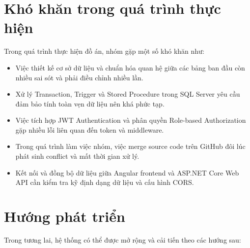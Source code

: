 
\section{Khó khăn trong quá trình thực hiện}\label{Sec5.3}

Trong quá trình thực hiện đồ án, nhóm gặp một số khó khăn như:

\begin{itemize}

  \item Việc thiết kế cơ sở dữ liệu và chuẩn hóa quan hệ giữa các bảng
  ban đầu còn nhiều sai sót và phải điều chỉnh nhiều lần.

  \item Xử lý Transaction, Trigger và Stored Procedure trong SQL Server
  yêu cầu đảm bảo tính toàn vẹn dữ liệu nên khá phức tạp.

  \item Việc tích hợp JWT Authentication và phân quyền
  Role-based Authorization gặp nhiều lỗi liên quan đến token và middleware.

  \item Trong quá trình làm việc nhóm, việc merge source code trên GitHub
  đôi lúc phát sinh conflict và mất thời gian xử lý.

  \item Kết nối và đồng bộ dữ liệu giữa Angular frontend và
  ASP.NET Core Web API cần kiểm tra kỹ định dạng dữ liệu và cấu hình CORS.

\end{itemize}


\section{Hướng phát triển}\label{Sec5.4}

Trong tương lai, hệ thống có thể được mở rộng và cải tiến theo các hướng sau:

